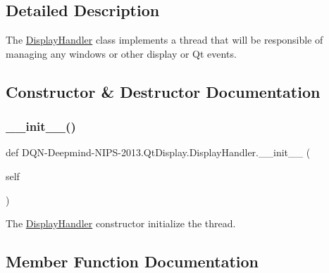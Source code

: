 \subsection{Detailed Description}
The \hyperlink{classDQN-Deepmind-NIPS-2013_1_1QtDisplay_1_1DisplayHandler}{Display\+Handler} class implements a thread that will be responsible of managing any windows or other display or Qt events. 

\subsection{Constructor \& Destructor Documentation}
\hypertarget{classDQN-Deepmind-NIPS-2013_1_1QtDisplay_1_1DisplayHandler_a417807e1b454c0cc3e86a8bddb2e6aee}{}\label{classDQN-Deepmind-NIPS-2013_1_1QtDisplay_1_1DisplayHandler_a417807e1b454c0cc3e86a8bddb2e6aee} 
\subsubsection{\texorpdfstring{\+\_\+\+\_\+init\+\_\+\+\_\+()}{\_\_init\_\_()}}
{\footnotesize\ttfamily def D\+QN-\/Deepmind-\/N\+I\+PS-\/2013.Qt\+Display.\+Display\+Handler.\+\_\+\+\_\+init\+\_\+\+\_\+ (\begin{DoxyParamCaption}\item[{}]{self }\end{DoxyParamCaption})}



The \hyperlink{classDQN-Deepmind-NIPS-2013_1_1QtDisplay_1_1DisplayHandler}{Display\+Handler} constructor initialize the thread. 



\subsection{Member Function Documentation}
\hypertarget{classDQN-Deepmind-NIPS-2013_1_1QtDisplay_1_1DisplayHandler_a9f10007a3cf4bfdf8b3908f57ef03b7b}{}\label{classDQN-Deepmind-NIPS-2013_1_1QtDisplay_1_1DisplayHandler_a9f10007a3cf4bfdf8b3908f57ef03b7b} 
